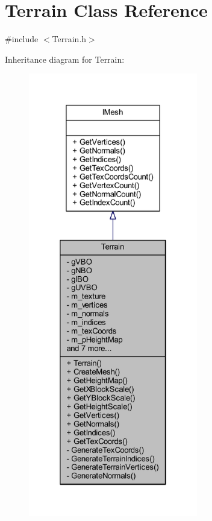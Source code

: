 \hypertarget{class_terrain}{}\section{Terrain Class Reference}
\label{class_terrain}


{\ttfamily \#include $<$Terrain.\+h$>$}



Inheritance diagram for Terrain\+:\nopagebreak
\begin{figure}[H]
\begin{center}
\leavevmode
\includegraphics[height=550pt]{class_terrain__inherit__graph}
\end{center}
\end{figure}


